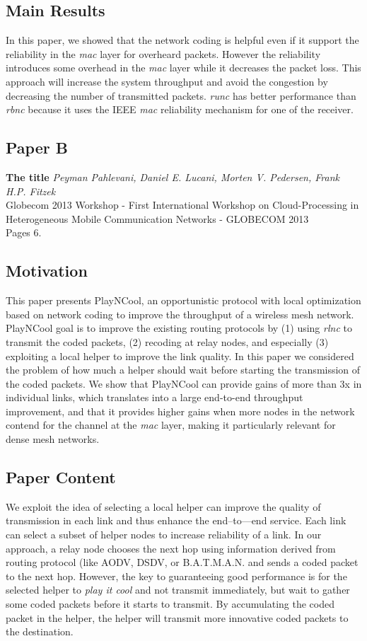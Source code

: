 \subsection*{Main Results}
In this paper, we showed that the network coding is helpful even if it support the reliability in the \textit{mac} layer for overheard packets. However the reliability introduces some overhead in the \textit{mac} layer while it decreases the packet loss. This approach will increase the system throughput and avoid the congestion by decreasing the number of transmitted packets. \textit{runc} has better performance than \textit{rbnc} because it uses the IEEE \textit{mac} reliability mechanism for one of the receiver.


\clearpage

\subsection{Paper B}
\textbf{The title}
\textit{Peyman Pahlevani, Daniel E. Lucani, Morten V. Pedersen, Frank H.P. Fitzek}
\\  Globecom 2013 Workshop - First International Workshop on Cloud-Processing in Heterogeneous Mobile Communication Networks - GLOBECOM 2013
\\ Pages 6.


\subsection*{Motivation}
This paper presents PlayNCool, an opportunistic protocol with local optimization based on network coding to improve the throughput of a wireless mesh network. PlayNCool goal is to improve the existing routing protocols by (1) using \textit{rlnc} to transmit the coded packets, (2) recoding at relay nodes, and especially (3) exploiting a local helper to improve the link quality. In this paper we considered the problem of how much a helper should wait before starting the transmission of the coded packets.  We show that PlayNCool can provide gains of more than 3x in individual links, which translates into a large end-to-end throughput improvement, and that it provides higher gains when more nodes in the network contend for the channel at the \textit{mac} layer, making it particularly relevant for dense mesh networks.
\subsection*{Paper Content}
We exploit the idea of selecting a local helper can improve the quality of transmission in each link and thus enhance the end--to—end service. Each link can select a subset of helper nodes to increase reliability of a link. In our approach, a relay node chooses the next hop using information derived from routing protocol (like AODV, DSDV, or B.A.T.M.A.N. and sends a coded packet to the next hop. However, the key to guaranteeing good performance is for the selected helper to \textit{play it cool} and not transmit immediately, but wait to gather some coded packets before it starts to transmit. By accumulating the coded packet in the helper, the helper will transmit more innovative coded packets to the destination.
